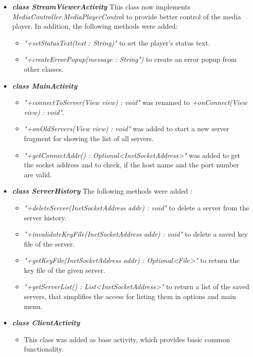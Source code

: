 \documentclass[a4paper,10pt]{scrartcl}
\begin{document}
\begin{itemize}
\item \textbf{\textit{class StreamViewerActivity}} \newline
   This class now implements  \textit{MediaController.MediaPlayerContro}l to provide better
  control of the media player. In addition, the following methods were added:
  \begin{itemize}
   \item \textit{"+setStatusText(text : String)"} to set the player's status text.
   \item \textit{"+createErrorPopup(message : String")} to create an error popup from other classes.
  \end{itemize}

   \item \textbf{\textit{class MainActivity}}
  \begin{itemize}
   \item \textit{"+connectToServer(View view) : void"} was renamed to \textit{+onConnect(View view) : void"}.
   \item \textit{"+onOldServers(View view) : void"} was added to start a new server fragment for showing the
    list of all servers.
    \item \textit{"+getConnectAddr() : Optional<InetSocketAddress>"} was added to get the socket address
    and to check, if the host name and the port number are valid.
  \end{itemize}

  \item \textbf{\textit{class ServerHistory}} \newline
  The following methods were added :
  \begin{itemize}
   \item \textit{"+deleteServer(InetSocketAddress addr) : void"} to delete a server from the server history.
   \item \textit{"+invalidateKeyFile(InetSocketAddress addr) : void"} to delete a saved key file of the server.
   \item \textit{"+getKeyFile(InetSocketAddress addr) : Optional<File>"} to return the key file of the given server.
   \item \textit{"+getServerList() : List<InetSocketAddress>"} to return a list of the saved servers, that simplifies the access for listing them in options and main menu.
  \end{itemize}

 \item \textit{\textbf{class ClientActivity}}
  \begin{itemize}
   \item This class was added as base activity, which provides basic common functionality.
  \end{itemize}


\end{itemize}
\end{document}
